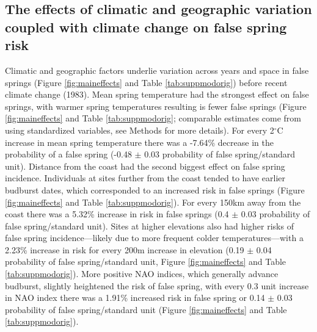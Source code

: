 \documentclass{article}\usepackage[]{graphicx}\usepackage[]{color}
\begin{document}


\subsection*{The effects of climatic and geographic variation coupled with climate change on false spring risk}
Climatic and geographic factors underlie variation across years and space in false springs (Figure \ref{fig:maineffects} and Table \ref{tab:suppmodorig}) before recent climate change (1983). Mean spring temperature had the strongest effect on false springs, with warmer spring temperatures resulting is fewer false springs (Figure \ref{fig:maineffects} and Table \ref{tab:suppmodorig}; comparable estimates come from using standardized variables, see Methods for more details). For every 2$^{\circ}$C increase in mean spring temperature there was a -7.64\% decrease in the probability of a false spring (-0.48 $\pm$ 0.03 probability of false spring/standard unit). Distance from the coast had the second biggest effect on false spring incidence. Individuals at sites further from the coast tended to have earlier budburst dates, which corresponded to an increased risk in false springs (Figure \ref{fig:maineffects} and Table \ref{tab:suppmodorig}). For every 150km away from the coast there was a 5.32\% increase in risk in false springs (0.4 $\pm$ 0.03 probability of false spring/standard unit). Sites at higher elevations also had higher risks of false spring incidence---likely due to more frequent colder temperatures---with a 2.23\% increase in risk for every 200m increase in elevation (0.19 $\pm$ 0.04 probability of false spring/standard unit, Figure \ref{fig:maineffects} and Table \ref{tab:suppmodorig}). More positive NAO indices, which generally advance budburst, slightly heightened the risk of false spring, with every 0.3 unit increase in NAO index there was a 1.91\% increased risk in false spring or 0.14 $\pm$ 0.03 probability of false spring/standard unit (Figure \ref{fig:maineffects} and Table \ref{tab:suppmodorig}).  
\end{document}
